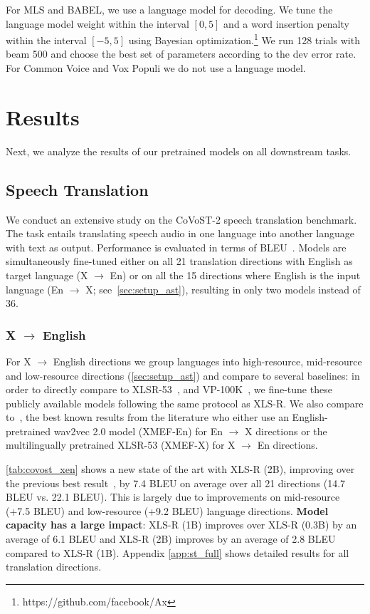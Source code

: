 \documentclass{article} \usepackage{iclr2022_conference,times}
\newcommand{\xlsrp}{XLS-R}
\newcommand{\xlsrpb}[1]{\xlsrp{} {(#1B)}}
\newcommand{\enx}{En $\rightarrow$ X}
\newcommand{\xen}{X $\rightarrow$ En}
\newcommand{\xenglish}{X $\rightarrow$ English}
\begin{document}
For MLS and BABEL, we use a language model for decoding.
We tune the language model weight within the interval $[0, 5]$ and a word insertion penalty within the interval $[-5, 5]$ using Bayesian optimization.\footnote{https://github.com/facebook/Ax} 
We run 128 trials with beam 500 and choose the best set of parameters according to the dev error rate. 
For Common Voice and Vox Populi we do not use a language model.



\section{Results}
Next, we analyze the results of our pretrained models on all downstream tasks.


\subsection{Speech Translation}
We conduct an extensive study on the CoVoST-2 speech translation benchmark. 
The task entails translating speech audio in one language into another language with text as output. 
Performance is evaluated in terms of BLEU~\citep{papineni2002bleu}.
Models are simultaneously fine-tuned either on all 21 translation directions with English as target language (\xen{}) or on all the 15 directions where English is the input language (\enx{}; see~\textsection\ref{sec:setup_ast}), resulting in only two models instead of 36.

\subsubsection{\xenglish{}}
\label{sec:st_xen}

For \xenglish{} directions we group languages into high-resource, mid-resource and low-resource directions (\textsection\ref{sec:setup_ast}) and compare to several baselines: in order to directly compare to XLSR-53~\citep{conneau2021xlsr}, and VP-100K~\citep{wang2021voxpopuli}, we fine-tune these publicly available models following the same protocol as \xlsrp{}. 
We also compare to~\citet{li2021multilingual}, the best known results from the literature who either use an English-pretrained wav2vec 2.0 model (XMEF-En) for \enx{} directions or the multilingually pretrained XLSR-53 (XMEF-X) for \xen{} directions.

\autoref{tab:covost_xen} shows a new state of the art with \xlsrpb{2}, improving over the previous best result~\citep{li2021multilingual}, by 7.4 BLEU on average over all 21 directions (14.7 BLEU vs. 22.1 BLEU).
This is largely due to improvements on mid-resource (+7.5 BLEU) and low-resource (+9.2 BLEU) language directions.
\textbf{Model capacity has a large impact}: \xlsrpb{1} improves over \xlsrpb{0.3} by an average of 6.1 BLEU and \xlsrpb{2} improves by an average of 2.8 BLEU compared to \xlsrpb{1}.
Appendix \ref{app:st_full} shows detailed results for all translation directions. 
\end{document}
